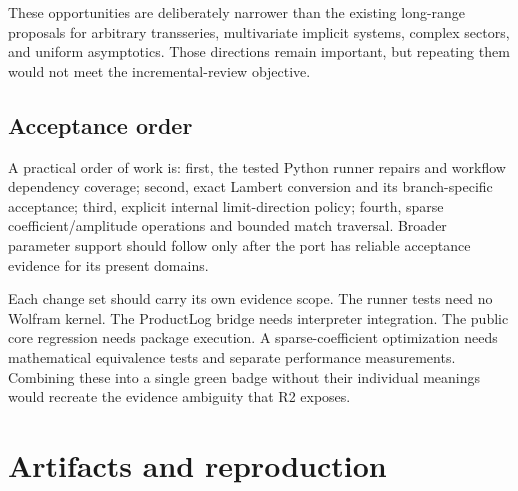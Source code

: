 \documentclass[11pt,a4paper]{article}
\begin{document}
These opportunities are deliberately narrower than the existing long-range proposals for arbitrary transseries, multivariate implicit systems, complex sectors, and uniform asymptotics. Those directions remain important, but repeating them would not meet the incremental-review objective.

\subsection{Acceptance order}
A practical order of work is: first, the tested Python runner repairs and workflow dependency coverage; second, exact Lambert conversion and its branch-specific acceptance; third, explicit internal limit-direction policy; fourth, sparse coefficient/amplitude operations and bounded match traversal. Broader parameter support should follow only after the port has reliable acceptance evidence for its present domains.

Each change set should carry its own evidence scope. The runner tests need no Wolfram kernel. The ProductLog bridge needs interpreter integration. The public core regression needs package execution. A sparse-coefficient optimization needs mathematical equivalence tests and separate performance measurements. Combining these into a single green badge without their individual meanings would recreate the evidence ambiguity that R2 exposes.

\section{Artifacts and reproduction}
\end{document}
